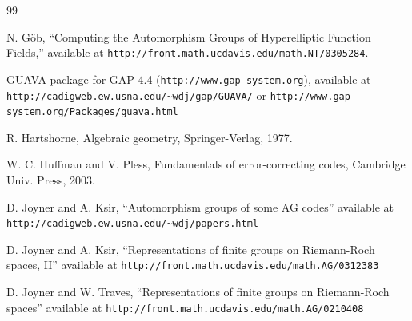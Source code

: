 \documentclass[12pt]{article}
\numberwithin{equation}{section}
\begin{document}
\begin{thebibliography}{99}  

%
%
%
%
% 
%


 N. G\"ob, ``Computing the Automorphism Groups of
Hyperelliptic Function Fields,'' available at
\verb+http://front.math.ucdavis.edu/math.NT/0305284+.

GUAVA package for GAP 4.4 (\verb+http://www.gap-system.org+),
available at
\verb+http://cadigweb.ew.usna.edu/~wdj/gap/GUAVA/+
or
\newline
\verb+http://www.gap-system.org/Packages/guava.html+

 R. Hartshorne, {Algebraic geometry},
Springer-Verlag, 1977.

 W. C. Huffman and V. Pless, {Fundamentals of 
error-correcting codes}, Cambridge Univ. Press, 2003.

 D. Joyner and A. Ksir, 
``Automorphism groups of some AG codes'' available at
\verb+http://cadigweb.ew.usna.edu/~wdj/papers.html+

 D. Joyner and A. Ksir, 
``Representations of finite groups on Riemann-Roch
spaces, II'' available at
\verb+http://front.math.ucdavis.edu/math.AG/0312383+

 D. Joyner and W. Traves, 
``Representations of finite groups on Riemann-Roch
spaces'' available at
\verb+http://front.math.ucdavis.edu/math.AG/0210408+

%
%


\end{thebibliography}
\end{document}

